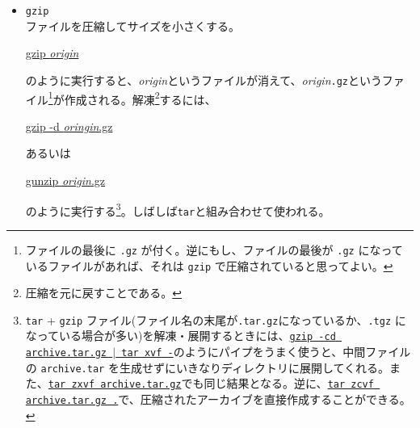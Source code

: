 \begin{itemize}
          ファイルをまとめて一つにまとめる。\textbf{t}ape \textbf{ar}chiverの略である。ファイルを転送したり、バックアップを取るときに利用する。
          \begin{commandline2}
              \prompt \underline{tar cvf ../archive.tar .}
          \end{commandline2} \noindent
          のように使うと、\texttt{../archive.tar} というファイル\footnote{ファイル名の最後に \texttt{.tar} を付ける習慣にしておくと、あとで混乱が少なくなる。}にカレントディレクトリ以下のすべてのファイルのバックアップが取られる。\texttt{.} の代わりに \texttt{\(\ast\).c} を使えば カレントディレクトリの \texttt{.c} で終るファイルがまとめられる。また、\texttt{.} の部分にディレクトリを指定すれば、そのディレクトリ以下のファイルすべてのバックアップを取ることができる。反対に展開するときは、
          \begin{commandline2}
              \prompt \underline{tar xvf archive.tar}
          \end{commandline2} \noindent
          のようにする。
    \item \texttt{gzip}\\
          ファイルを圧縮してサイズを小さくする。
          \begin{commandline2}
              \prompt \underline{gzip \textit{origin}}
          \end{commandline2} \noindent
          のように実行すると、\textit{origin}というファイルが消えて、\textit{origin}\texttt{.gz}というファイル\footnote{ファイルの最後に \texttt{.gz} が付く。逆にもし、ファイルの最後が \texttt{.gz} になっているファイルがあれば、それは \texttt{gzip} で圧縮されていると思ってよい。}が作成される。解凍\footnote{圧縮を元に戻すことである。}するには、
          \begin{commandline2}
              \prompt \underline{gzip -d \textit{oringin}.gz}
          \end{commandline2} \noindent
          あるいは
          \begin{commandline2}
              \prompt \underline{gunzip \textit{origin}.gz}
          \end{commandline2} \noindent
          のように実行する\footnote{\texttt{tar} + \texttt{gzip} ファイル(ファイル名の末尾が\texttt{.tar.gz}になっているか、\texttt{.tgz} になっている場合が多い)を解凍・展開するときには、\texttt{\underline{gzip -cd archive.tar.gz \(|\) tar xvf -}}のようにパイプをうまく使うと、中間ファイルの \texttt{archive.tar} を生成せずにいきなりディレクトリに展開してくれる。また、\underline{\texttt{tar zxvf archive.tar.gz}}でも同じ結果となる。逆に、\underline{\texttt{tar zcvf archive.tar.gz .}}で、圧縮されたアーカイブを直接作成することができる。}。しばしば\texttt{tar}と組み合わせて使われる。


\end{itemize}
